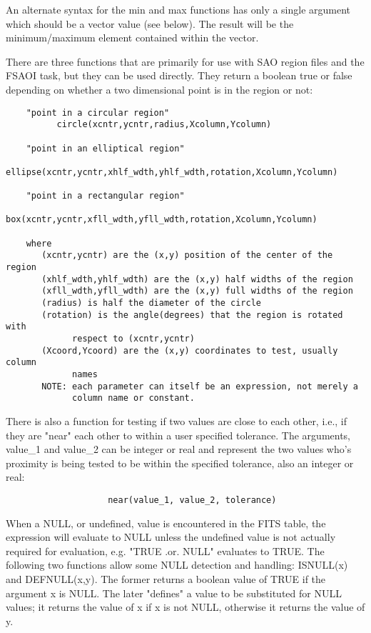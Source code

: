 \documentclass[11pt]{book}
\begin{document}
    An alternate syntax for the min and max functions  has only a single
    argument which  should be  a  vector value (see  below).  The result
    will be the minimum/maximum element contained within the vector.

    There are three functions that are primarily for use with SAO region
    files and the  FSAOI  task, but they  can  be  used  directly.  They
    return  a  boolean true   or  false  depending   on  whether a   two
    dimensional point is in the region or not:

\begin{verbatim}
    "point in a circular region"
          circle(xcntr,ycntr,radius,Xcolumn,Ycolumn)

    "point in an elliptical region"
         ellipse(xcntr,ycntr,xhlf_wdth,yhlf_wdth,rotation,Xcolumn,Ycolumn)

    "point in a rectangular region"
             box(xcntr,ycntr,xfll_wdth,yfll_wdth,rotation,Xcolumn,Ycolumn)

    where
       (xcntr,ycntr) are the (x,y) position of the center of the region
       (xhlf_wdth,yhlf_wdth) are the (x,y) half widths of the region
       (xfll_wdth,yfll_wdth) are the (x,y) full widths of the region
       (radius) is half the diameter of the circle
       (rotation) is the angle(degrees) that the region is rotated with
             respect to (xcntr,ycntr)
       (Xcoord,Ycoord) are the (x,y) coordinates to test, usually column
             names
       NOTE: each parameter can itself be an expression, not merely a
             column name or constant.
\end{verbatim}

    There is also a function for testing if  two  values  are  close  to
    each  other,  i.e.,  if  they are "near" each other to within a user
    specified tolerance. The  arguments,  value\_1  and  value\_2  can  be
    integer  or  real  and  represent  the two values who's proximity is
    being tested to be within the specified tolerance, also  an  integer
    or real:

\begin{verbatim}
                    near(value_1, value_2, tolerance)
\end{verbatim}
    When  a  NULL, or undefined, value is encountered in the FITS table,
    the expression will evaluate to NULL unless the undefined  value  is
    not   actually   required  for  evaluation,  e.g. "TRUE  .or.  NULL"
    evaluates to TRUE. The  following  two  functions  allow  some  NULL
    detection  and  handling:  ISNULL(x)  and  DEFNULL(x,y).  The former
    returns a boolean value of TRUE if the  argument  x  is  NULL.   The
    later  "defines"  a  value  to  be  substituted  for NULL values; it
    returns the value of x if x is not NULL, otherwise  it  returns  the
    value of y.
\end{document}
